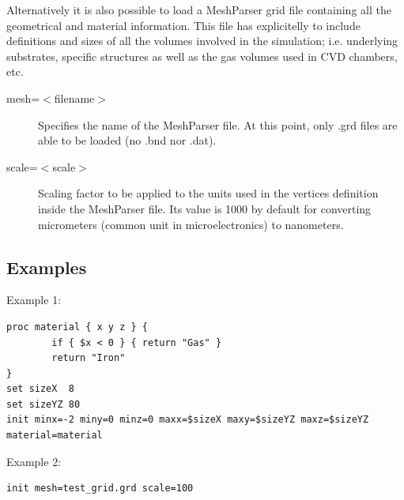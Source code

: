 Alternatively it is also possible to load a MeshParser grid file containing all the geometrical and material information. This file has explicitelly to include definitions and sizes of all the volumes involved in the simulation; i.e. underlying substrates, specific structures as well as the gas volumes used in CVD chambers, etc.

\begin{description}
\item [mesh=$<$filename$>$] Specifies the name of the MeshParser file. At this point, only .grd files are able to be loaded (no .bnd nor .dat).
\item [scale=$<$scale$>$] Scaling factor to be applied to the units used in the vertices definition inside the MeshParser file. Its value is 1000 by default for converting micrometers (common unit in microelectronics) to nanometers.
\end{description}

\subsection{Examples}
Example 1:
\begin{lstlisting}
proc material { x y z } {
        if { $x < 0 } { return "Gas" }
        return "Iron"
}
set sizeX  8
set sizeYZ 80
init minx=-2 miny=0 minz=0 maxx=$sizeX maxy=$sizeYZ maxz=$sizeYZ material=material
\end{lstlisting}

Example 2:
\begin{lstlisting}
init mesh=test_grid.grd scale=100
\end{lstlisting}
